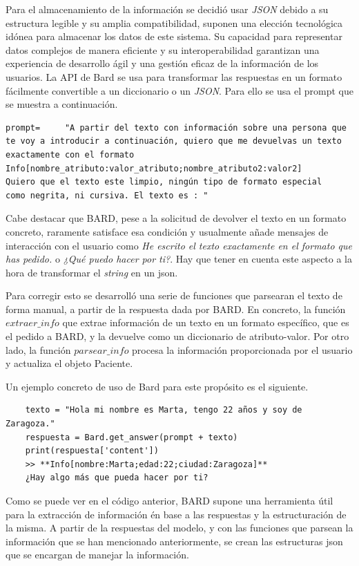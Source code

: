 Para el almacenamiento de la información se decidió usar \textit{JSON} debido a su estructura legible y su amplia compatibilidad, suponen una elección tecnológica idónea para almacenar los datos de este sistema. Su capacidad para representar datos complejos de manera eficiente y su interoperabilidad garantizan una experiencia de desarrollo ágil y una gestión eficaz de la información de los usuarios. La API de Bard se usa para transformar las respuestas en un formato fácilmente convertible a un diccionario o un \textit{JSON}. Para ello se usa el prompt que se muestra a continuación.

\begin{verbatim}
prompt= 	"A partir del texto con información sobre una persona que
te voy a introducir a continuación, quiero que me devuelvas un texto
exactamente con el formato
Info[nombre_atributo:valor_atributo;nombre_atributo2:valor2]
Quiero que el texto este limpio, ningún tipo de formato especial
como negrita, ni cursiva. El texto es : "
\end{verbatim} 

Cabe destacar que BARD, pese a la solicitud de devolver el texto en un formato concreto, raramente satisface esa condición y usualmente añade mensajes de interacción con el usuario como \textit{He escrito el texto exactamente en el formato que has pedido.} o \textit{¿Qué puedo hacer por ti?}. Hay que tener en cuenta este aspecto a la hora de transformar el \textit{string} en un json. 

Para corregir esto se desarrolló una serie de funciones que parsearan el texto de forma manual, a partir de la respuesta dada por BARD. En concreto, la función $extraer\_info$ que extrae información de un texto en un formato específico, que es el pedido a BARD, y la devuelve como un diccionario de atributo-valor. Por otro lado, la función $parsear\_info$ procesa la información proporcionada por el usuario y actualiza el objeto Paciente.

Un ejemplo concreto de uso de Bard para este propósito es el siguiente. 
\begin{verbatim}
	texto = "Hola mi nombre es Marta, tengo 22 años y soy de Zaragoza."
	respuesta = Bard.get_answer(prompt + texto)
	print(respuesta['content'])
	>> **Info[nombre:Marta;edad:22;ciudad:Zaragoza]** 
	¿Hay algo más que pueda hacer por ti?
\end{verbatim}

Como se puede ver en el código anterior, BARD supone una herramienta útil para la extracción de información én base a las respuestas y la estructuración de la misma. A partir de la respuestas del modelo, y con las funciones que parsean la información que se han mencionado anteriormente, se crean las estructuras json que se encargan de manejar la información. 

